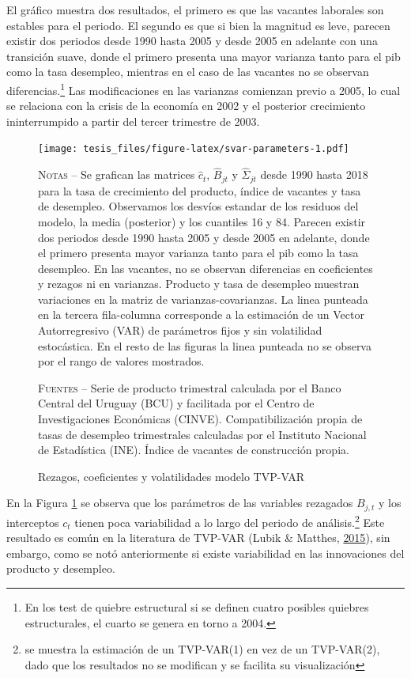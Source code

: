 \documentclass[12pt,oneside]{reedthesis}
\begin{document}
El gráfico muestra dos resultados, el primero es que las vacantes laborales son estables para el periodo. El segundo es que si bien la magnitud es leve, parecen existir dos periodos desde 1990 hasta 2005 y desde 2005 en adelante con una transición suave, donde el primero presenta una mayor varianza tanto para el pib como la tasa desempleo, mientras en el caso de las vacantes no se observan diferencias.\footnote{En los test de quiebre estructural si se definen cuatro posibles quiebres estructurales, el cuarto se genera en torno a 2004.} Las modificaciones en las varianzas comienzan previo a 2005, lo cual se relaciona con la crisis de la economía en 2002 y el posterior crecimiento ininterrumpido a partir del tercer trimestre de 2003.
\begin{figure}
\texttt{[image: tesis\_files/figure-latex/svar-parameters-1.pdf]}
\caption{Rezagos, coeficientes y volatilidades modelo TVP-VAR}\label{fig:svar-parameters}\textsc{}

\footnotesize\textsc{Notas} -- Se grafican las matrices $\hat{c}_{t}$, $\hat{B}_{jt}$ y $\hat{\Sigma}_{jt}$ desde 1990 hasta 2018 para la tasa de crecimiento del producto, índice de vacantes y tasa de desempleo. Observamos los desvíos estandar de los residuos del modelo, la media (posterior) y los cuantiles 16 y 84. Parecen existir dos periodos desde 1990 hasta 2005 y desde 2005 en adelante, donde el primero presenta mayor varianza tanto para el pib como la tasa desempleo. En las vacantes, no se observan diferencias en coeficientes y rezagos ni en varianzas. Producto y tasa de desempleo muestran variaciones en la matriz de varianzas-covarianzas. La linea punteada en la tercera fila-columna corresponde a la estimación de un Vector Autorregresivo (VAR) de parámetros fijos y sin volatilidad estocástica. En el resto de las figuras la linea punteada no se observa por el rango de valores mostrados.

\textsc{Fuentes} -- Serie de producto trimestral calculada por el Banco Central del Uruguay (BCU) y facilitada por el Centro de Investigaciones Económicas (CINVE). Compatibilización propia de tasas de desempleo trimestrales calculadas por el Instituto Nacional de Estadística (INE). Índice de vacantes de construcción propia.
\end{figure}
En la Figura \ref{fig:svar-parameters} se observa que los parámetros de las variables rezagados \(B_{j,t}\) y los interceptos \(c_{t}\) tienen poca variabilidad a lo largo del periodo de análisis.\footnote{se muestra la estimación de un TVP-VAR(1) en vez de un TVP-VAR(2), dado que los resultados no se modifican y se facilita su visualización} Este resultado es común en la literatura de TVP-VAR (Lubik \& Matthes, \protect\hyperlink{ref-Lubik2016b}{2015}), sin embargo, como se notó anteriormente si existe variabilidad en las innovaciones del producto y desempleo.
\end{document}

